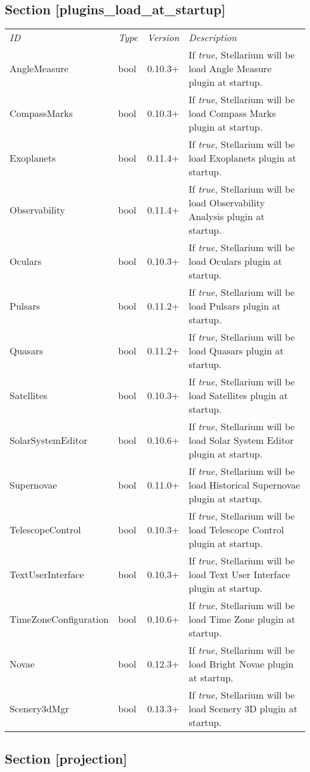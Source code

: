 \subsection{Section
{[}plugins\_load\_at\_startup{]}}\label{section-pluginsux5floadux5fatux5fstartup}

\begin{longtable}[c]{@{}llll@{}}
\toprule
\emph{ID} & \emph{Type} & \emph{Version} &
\emph{Description}\tabularnewline
AngleMeasure & bool & 0.10.3+ & If \emph{true}, Stellarium will be load
Angle Measure plugin at startup.\tabularnewline
CompassMarks & bool & 0.10.3+ & If \emph{true}, Stellarium will be load
Compass Marks plugin at startup.\tabularnewline
Exoplanets & bool & 0.11.4+ & If \emph{true}, Stellarium will be load
Exoplanets plugin at startup.\tabularnewline
Observability & bool & 0.11.4+ & If \emph{true}, Stellarium will be load
Observability Analysis plugin at startup.\tabularnewline
Oculars & bool & 0.10.3+ & If \emph{true}, Stellarium will be load
Oculars plugin at startup.\tabularnewline
Pulsars & bool & 0.11.2+ & If \emph{true}, Stellarium will be load
Pulsars plugin at startup.\tabularnewline
Quasars & bool & 0.11.2+ & If \emph{true}, Stellarium will be load
Quasars plugin at startup.\tabularnewline
Satellites & bool & 0.10.3+ & If \emph{true}, Stellarium will be load
Satellites plugin at startup.\tabularnewline
SolarSystemEditor & bool & 0.10.6+ & If \emph{true}, Stellarium will be
load Solar System Editor plugin at startup.\tabularnewline
Supernovae & bool & 0.11.0+ & If \emph{true}, Stellarium will be load
Historical Supernovae plugin at startup.\tabularnewline
TelescopeControl & bool & 0.10.3+ & If \emph{true}, Stellarium will be
load Telescope Control plugin at startup.\tabularnewline
TextUserInterface & bool & 0.10.3+ & If \emph{true}, Stellarium will be
load Text User Interface plugin at startup.\tabularnewline
TimeZoneConfiguration & bool & 0.10.6+ & If \emph{true}, Stellarium will
be load Time Zone plugin at startup.\tabularnewline
Novae & bool & 0.12.3+ & If \emph{true}, Stellarium will be load Bright
Novae plugin at startup.\tabularnewline
Scenery3dMgr & bool & 0.13.3+ & If \emph{true}, Stellarium will be load
Scenery 3D plugin at startup.\tabularnewline
\bottomrule
\end{longtable}

\subsection{Section {[}projection{]}}\label{section-projection}

